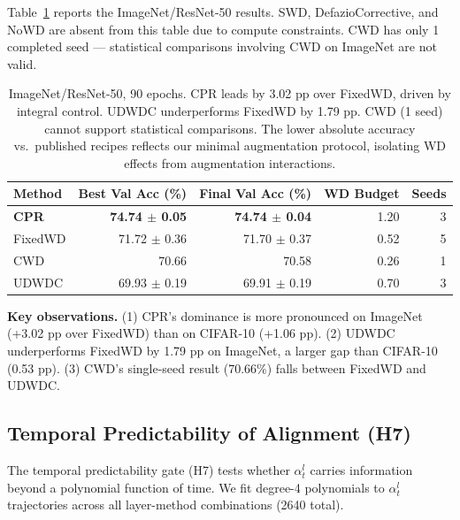 \documentclass{article}
\begin{document}
Table~\ref{tab:imagenet} reports the ImageNet/ResNet-50 results. SWD, DefazioCorrective, and NoWD are absent from this table due to compute constraints. CWD has only 1 completed seed --- statistical comparisons involving CWD on ImageNet are not valid.

\begin{table}[t]
\centering
\caption{ImageNet/ResNet-50, 90 epochs. CPR leads by 3.02 pp over FixedWD, driven by integral control. UDWDC underperforms FixedWD by 1.79 pp. CWD (1 seed) cannot support statistical comparisons. The lower absolute accuracy vs.~published recipes reflects our minimal augmentation protocol, isolating WD effects from augmentation interactions.}
\label{tab:imagenet}
\begin{tabular}{lrrrr}
\toprule
Method & Best Val Acc (\%) & Final Val Acc (\%) & WD Budget & Seeds \\
\midrule
\textbf{CPR} & \textbf{74.74 $\pm$ 0.05} & \textbf{74.74 $\pm$ 0.04} & 1.20 & 3 \\
FixedWD & 71.72 $\pm$ 0.36 & 71.70 $\pm$ 0.37 & 0.52 & 5 \\
CWD & 70.66 & 70.58 & 0.26 & 1 \\
UDWDC & 69.93 $\pm$ 0.19 & 69.91 $\pm$ 0.19 & 0.70 & 3 \\
\bottomrule
\end{tabular}
\end{table}

\textbf{Key observations.} (1) CPR's dominance is more pronounced on ImageNet (+3.02 pp over FixedWD) than on CIFAR-10 (+1.06 pp). (2) UDWDC underperforms FixedWD by 1.79 pp on ImageNet, a larger gap than CIFAR-10 (0.53 pp). (3) CWD's single-seed result (70.66\%) falls between FixedWD and UDWDC.

\subsection{Temporal Predictability of Alignment (H7)}

The temporal predictability gate (H7) tests whether $\alpha_t^l$ carries information beyond a polynomial function of time. We fit degree-4 polynomials to $\alpha_t^l$ trajectories across all layer-method combinations (2640 total).
\end{document}
